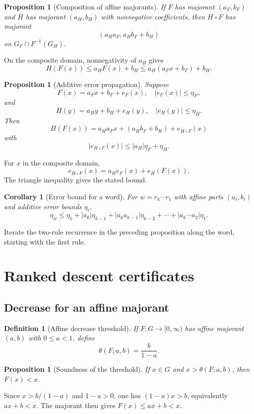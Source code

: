 \documentclass[12pt,a4paper,twoside]{extarticle}
\makeatletter
\theoremstyle{compactplain}
\newtheorem{proposition}[theorem]{Proposition}
\newtheorem{corollary}[theorem]{Corollary}
\theoremstyle{compactdef}
\newtheorem{definition}[theorem]{Definition}
\renewenvironment{proof}[1][\proofname]{\par\pushQED{\qed}\normalfont
  \topsep2pt\trivlist\item[\hskip\labelsep\bfseries #1\@addpunct{.}]\ignorespaces}
 {\popQED\endtrivlist\@endpefalse}
\makeatother
\begin{document}
\begin{proposition}[Composition of affine majorants]
If $F$ has majorant $(a_F,b_F)$ and $H$ has majorant $(a_H,b_H)$ with nonnegative coefficients, then $H\circ F$ has majorant
\[
(a_Ha_F,a_Hb_F+b_H)
\]
on $G_F\cap F^{-1}(G_H)$.
\end{proposition}
\begin{proof}
On the composite domain, nonnegativity of $a_H$ gives
\[
H(F(x))\le a_HF(x)+b_H
\le a_H(a_Fx+b_F)+b_H.
\]
\end{proof}

\begin{proposition}[Additive error propagation]
Suppose
\[
F(x)=a_Fx+b_F+e_F(x),\quad |e_F(x)|\le\eta_F,
\]
and
\[
H(y)=a_Hy+b_H+e_H(y),\quad |e_H(y)|\le\eta_H.
\]
Then
\[
H(F(x))=a_Ha_Fx+(a_Hb_F+b_H)+e_{H\circ F}(x)
\]
with
\[
|e_{H\circ F}(x)|\le |a_H|\eta_F+\eta_H.
\]
\end{proposition}
\begin{proof}
For $x$ in the composite domain,
\[
e_{H\circ F}(x)=a_He_F(x)+e_H(F(x)).
\]
The triangle inequality gives the stated bound.
\end{proof}

\begin{corollary}[Error bound for a word]
For $w=r_k\cdots r_1$ with affine parts $(a_i,b_i)$ and additive error bounds $\eta_i$,
\[
\eta_w\le \eta_k+|a_k|\eta_{k-1}+|a_ka_{k-1}|\eta_{k-2}+\cdots+|a_k\cdots a_2|\eta_1.
\]
\end{corollary}
\begin{proof}
Iterate the two-rule recurrence in the preceding proposition along the word, starting with the first rule.
\end{proof}
\section{Ranked descent certificates}

\subsection{Decrease for an affine majorant}
\begin{definition}[Affine decrease threshold]
If $F:G\to[0,\infty)$ has affine majorant $(a,b)$ with $0\le a<1$, define
\[
\theta(F;a,b)=\frac{b}{1-a}.
\]
\end{definition}

\begin{proposition}[Soundness of the threshold]
If $x\in G$ and $x>\theta(F;a,b)$, then $F(x)<x$.
\end{proposition}
\begin{proof}
Since $x>b/(1-a)$ and $1-a>0$, one has $(1-a)x>b$, equivalently $ax+b<x$.  The majorant then gives $F(x)\le ax+b<x$.
\end{proof}
\end{document}
